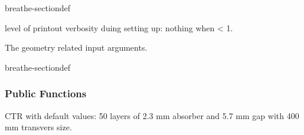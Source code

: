 \documentclass[letterpaper,10pt,english]{sphinxmanual}
\begin{document}
\begin{fulllineitems}
\begin{sphinxuseclass}{breathe-sectiondef}
\begin{fulllineitems}
\end{fulllineitems}


\begin{fulllineitems}
\label{\detokenize{Simulation/SimulationCodeDoc:_CPPv4N15InputParameters13fRunVerbosityE}}
\pysigstartsignatures
\pysigstartmultiline
{}
\pysigstopmultiline
\pysigstopsignatures
\sphinxAtStartPar
level of printout verbosity duing setting up: nothing when \textless{} 1. 

\end{fulllineitems}


\end{sphinxuseclass}

\begin{fulllineitems}
\label{\detokenize{Simulation/SimulationCodeDoc:_CPPv4N15InputParameters8GeometryE}}
\pysigstartsignatures
\pysigstartmultiline
{}
\pysigstopmultiline
\pysigstopsignatures
\sphinxAtStartPar
The geometry related input arguments. 

\begin{sphinxuseclass}{breathe-sectiondef}\subsubsection*{Public Functions}

\begin{fulllineitems}
\label{\detokenize{Simulation/SimulationCodeDoc:_CPPv4N15InputParameters8Geometry8GeometryEv}}
\pysigstartsignatures
\pysigstartmultiline
{}
\pysigstopmultiline
\pysigstopsignatures
\sphinxAtStartPar
CTR with default values: 50 layers of 2.3 mm absorber and 5.7 mm gap with 400 mm transvers size. 


\end{fulllineitems}
\end{sphinxuseclass}
\end{fulllineitems}
\end{fulllineitems}
\end{document}
